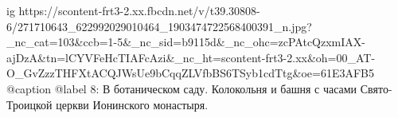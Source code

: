  
 
 
 
 

\ifcmt
  ig https://scontent-frt3-2.xx.fbcdn.net/v/t39.30808-6/271710643_622992029010464_1903474722568400391_n.jpg?_nc_cat=103&ccb=1-5&_nc_sid=b9115d&_nc_ohc=zcPAtcQzxmIAX-ajDzA&tn=lCYVFeHcTIAFcAzi&_nc_ht=scontent-frt3-2.xx&oh=00_AT-O_GvZzzTHFXtACQJWsUe9bCqqZLVfbBS6TSyb1cdTtg&oe=61E3AFB5
  @caption @label 8: В ботаническом саду. Колокольня и башня с часами Свято-Троицкой церкви Ионинского монастыря.
\fi

